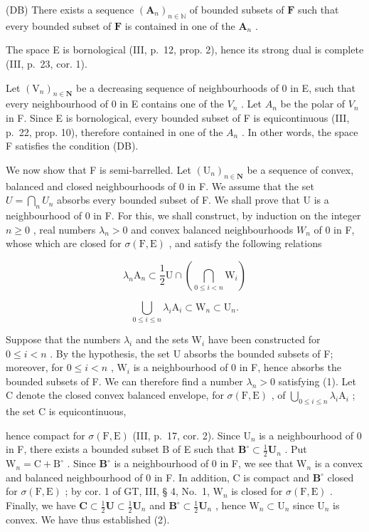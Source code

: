 (DB) There exists a sequence \((\mathbf{A}_n)_{n\in \mathbb{N}}\) of bounded subsets of \(\mathbf{F}\) such that every bounded subset of \(\mathbf{F}\) is contained in one of the \(\mathbf{A}_n\) .

The space E is bornological (III, p.~12, prop. 2), hence its strong dual is complete (III, p.~23, cor. 1).

Let \((\mathrm{V}_{n})_{n\in\mathbf{N}}\) be a decreasing sequence of neighbourhoods of 0 in E, such that every neighbourhood of 0 in E contains one of the \(V_{n}\) . Let \(A_{n}\) be the polar of \(V_{n}\) in F. Since E is bornological, every bounded subset of F is equicontinuous (III, p.~22, prop. 10), therefore contained in one of the \(A_{n}\) . In other words, the space F satisfies the condition (DB).

We now show that F is semi-barrelled. Let \((\mathrm{U}_{n})_{n\in\mathbf{N}}\) be a sequence of convex, balanced and closed neighbourhoods of 0 in F. We assume that the set \(U=\bigcap_{n}U_{n}\) absorbs every bounded subset of F. We shall prove that U is a neighbourhood of 0 in F. For this, we shall construct, by induction on the integer \(n\geqslant0\) , real numbers \(\lambda_{n}>0\) and convex balanced neighbourhoods \(W_{n}\) of 0 in F, whose which are closed for \(\sigma(\mathrm{F},\mathrm{E})\) , and satisfy the following relations

\[
\lambda_ {n} \mathrm{A} _ {n} \subset \frac {1}{2} \mathrm{U} \cap \left(\bigcap_ {0 \leqslant i <   n} \mathrm{W} _ {i}\right)\tag{1}
\]

\[
\bigcup_ {0 \leqslant i \leqslant n} \lambda_ {i} \mathrm{A} _ {i} \subset \mathrm{W} _ {n} \subset \mathrm{U} _ {n}.\tag{2}
\]

Suppose that the numbers \(\lambda_{i}\) and the sets \(\mathrm{W}_i\) have been constructed for \(0 \leqslant i < n\) . By the hypothesis, the set U absorbs the bounded subsets of F; moreover, for \(0 \leqslant i < n\) , \(\mathrm{W}_i\) is a neighbourhood of 0 in F, hence absorbs the bounded subsets of F. We can therefore find a number \(\lambda_{n} > 0\) satisfying (1). Let C denote the closed convex balanced envelope, for \(\sigma(\mathrm{F}, \mathrm{E})\) , of \(\bigcup_{0 \leqslant i \leqslant n} \lambda_i \mathrm{A}_i\) ; the set C is equicontinuous,

hence compact for \(\sigma(\mathrm{F},\mathrm{E})\) (III, p.~17, cor. 2). Since \(\mathrm{U}_n\) is a neighbourhood of 0 in F, there exists a bounded subset B of E such that \(\mathbf{B}^{\circ}\subset\frac{1}{2}\mathbf{U}_{n}\) . Put \(\mathrm{W}_n=\mathrm{C}+\mathrm{B}^{\circ}\) . Since \(\mathbf{B}^{\circ}\) is a neighbourhood of 0 in F, we see that \(\mathrm{W}_n\) is a convex and balanced neighbourhood of 0 in F. In addition, C is compact and \(\mathbf{B}^{\circ}\) closed for \(\sigma(\mathrm{F},\mathrm{E})\) ; by cor. 1 of GT, III, § 4, No.~1, \(\mathrm{W}_n\) is closed for \(\sigma(\mathrm{F},\mathrm{E})\) . Finally, we have \(\mathbf{C}\subset\frac{1}{2}\mathbf{U}\subset\frac{1}{2}\mathbf{U}_n\) and \(\mathbf{B}^{\circ}\subset\frac{1}{2}\mathbf{U}_n\) , hence \(\mathrm{W}_n\subset\mathrm{U}_n\) since \(\mathrm{U}_n\) is convex. We have thus established (2).

